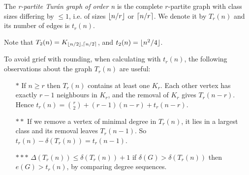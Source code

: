 \documentclass[10pt,a4paper]{article}
\begin{document}
The \emph{r-partite Tur\'an graph of order n} is the complete $r$-partite graph with class sizes differing by $\leq 1$, i.e. of sizes $\lfloor n/r \rfloor$ or $\lceil n/r \rceil$. We denote it by $T_r(n)$ and its number of edges is $t_r(n)$.

Note that $T_2(n) = K_{\lfloor n/2 \rfloor,\lceil n/2 \rceil}$, and $t_2(n) = \lfloor n^2/4 \rfloor$.

To avoid grief with rounding, when calculating with $t_r(n)$, the following observations about the graph $T_r(n)$ are useful:

\begin{itemize}
\item[$\ast$] If $n\geq r$ then $T_r(n)$ contains at least one $K_r$. Each other vertex has exactly $r-1$ neighbours in $K_r$, and the removal of $K_r$ gives $T_r(n-r)$. Hence $t_r(n) = \binom{r}{2} + (r-1)(n-r) + t_r(n-r)$.

\item[$\ast\ast$] If we remove a vertex of minimal degree in $T_r(n)$, it lies in a largest class and its removal leaves $T_r(n-1)$. So $t_r(n) - \delta(T_r(n)) = t_r(n-1)$.

\item[$\ast\ast\ast$] $\Delta(T_r(n)) \leq \delta(T_r(n)) + 1$ if $\delta(G) > \delta(T_r(n))$ then $e(G) > t_r(n)$, by comparing degree sequences.
\end{itemize}
\end{document}
